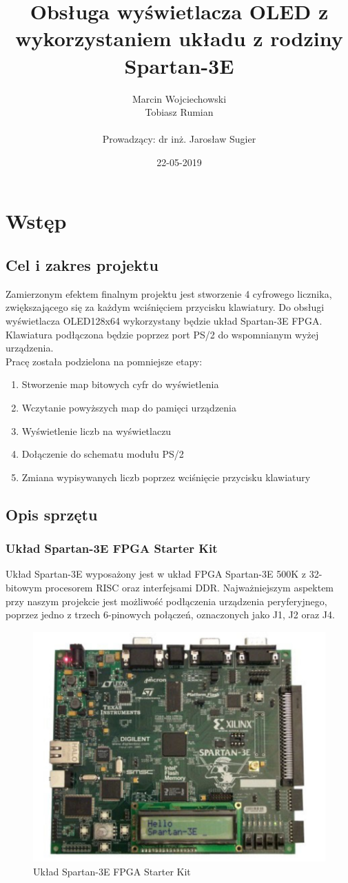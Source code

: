 \documentclass[]{article}
\title{Obsługa wyświetlacza OLED z wykorzystaniem układu z rodziny Spartan-3E}
\date{22-05-2019}
\author{
	Marcin Wojciechowski \\
	Tobiasz Rumian \\ \\
	Prowadzący: dr inż. Jarosław Sugier
}
\begin{document}
	\maketitle
	\newpage
	\tableofcontents
	\newpage

	\section{Wstęp}
	\subsection{Cel i zakres projektu}
	Zamierzonym efektem finalnym projektu jest stworzenie 4 cyfrowego licznika, zwiększającego się za każdym wciśnięciem przycisku klawiatury. Do obsługi wyświetlacza OLED128x64 wykorzystany będzie układ Spartan-3E FPGA. Klawiatura podłączona będzie poprzez port PS/2 do wspomnianym wyżej urządzenia.\\
	Pracę została podzielona na pomniejsze etapy:
	\begin{enumerate}
		\item Stworzenie map bitowych cyfr do wyświetlenia
		\item Wczytanie powyższych map do pamięci urządzenia
		\item Wyświetlenie liczb na wyświetlaczu
		\item Dołączenie do schematu modułu PS/2
		\item Zmiana wypisywanych liczb poprzez wciśnięcie przycisku klawiatury
	\end{enumerate}
	
	\subsection{Opis sprzętu}
	\subsubsection{Układ Spartan-3E FPGA Starter Kit}
	Układ Spartan-3E wyposażony jest w układ FPGA Spartan-3E 500K z 32-bitowym procesorem RISC oraz interfejsami DDR. Najważniejszym aspektem przy naszym projekcie jest możliwość podłączenia urządzenia peryferyjnego, poprzez jedno z trzech 6-pinowych połączeń, oznaczonych jako J1, J2 oraz J4. \cite{ug230}
	\begin{figure}[H]
		\includegraphics[width=.7\linewidth]{img/spartan.jpg}
		\centering
		\caption{Układ Spartan-3E FPGA Starter Kit}
		\label{fig:spartan}
	\end{figure}
\end{document}
